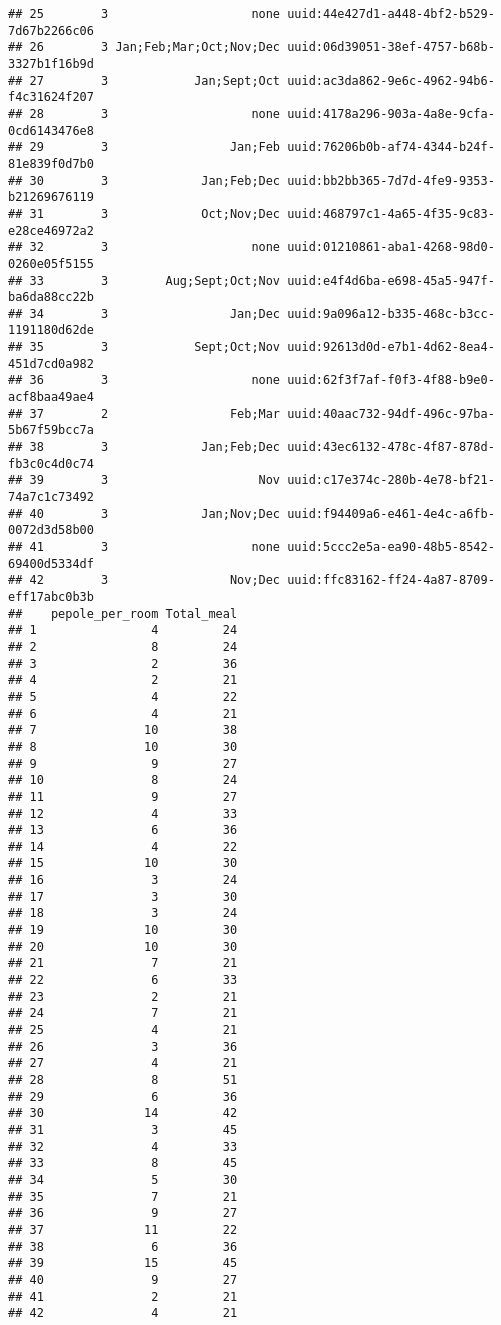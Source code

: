 \documentclass[
]{article}
\begin{document}
\begin{verbatim}
## 25        3                    none uuid:44e427d1-a448-4bf2-b529-7d67b2266c06
## 26        3 Jan;Feb;Mar;Oct;Nov;Dec uuid:06d39051-38ef-4757-b68b-3327b1f16b9d
## 27        3            Jan;Sept;Oct uuid:ac3da862-9e6c-4962-94b6-f4c31624f207
## 28        3                    none uuid:4178a296-903a-4a8e-9cfa-0cd6143476e8
## 29        3                 Jan;Feb uuid:76206b0b-af74-4344-b24f-81e839f0d7b0
## 30        3             Jan;Feb;Dec uuid:bb2bb365-7d7d-4fe9-9353-b21269676119
## 31        3             Oct;Nov;Dec uuid:468797c1-4a65-4f35-9c83-e28ce46972a2
## 32        3                    none uuid:01210861-aba1-4268-98d0-0260e05f5155
## 33        3        Aug;Sept;Oct;Nov uuid:e4f4d6ba-e698-45a5-947f-ba6da88cc22b
## 34        3                 Jan;Dec uuid:9a096a12-b335-468c-b3cc-1191180d62de
## 35        3            Sept;Oct;Nov uuid:92613d0d-e7b1-4d62-8ea4-451d7cd0a982
## 36        3                    none uuid:62f3f7af-f0f3-4f88-b9e0-acf8baa49ae4
## 37        2                 Feb;Mar uuid:40aac732-94df-496c-97ba-5b67f59bcc7a
## 38        3             Jan;Feb;Dec uuid:43ec6132-478c-4f87-878d-fb3c0c4d0c74
## 39        3                     Nov uuid:c17e374c-280b-4e78-bf21-74a7c1c73492
## 40        3             Jan;Nov;Dec uuid:f94409a6-e461-4e4c-a6fb-0072d3d58b00
## 41        3                    none uuid:5ccc2e5a-ea90-48b5-8542-69400d5334df
## 42        3                 Nov;Dec uuid:ffc83162-ff24-4a87-8709-eff17abc0b3b
##    pepole_per_room Total_meal
## 1                4         24
## 2                8         24
## 3                2         36
## 4                2         21
## 5                4         22
## 6                4         21
## 7               10         38
## 8               10         30
## 9                9         27
## 10               8         24
## 11               9         27
## 12               4         33
## 13               6         36
## 14               4         22
## 15              10         30
## 16               3         24
## 17               3         30
## 18               3         24
## 19              10         30
## 20              10         30
## 21               7         21
## 22               6         33
## 23               2         21
## 24               7         21
## 25               4         21
## 26               3         36
## 27               4         21
## 28               8         51
## 29               6         36
## 30              14         42
## 31               3         45
## 32               4         33
## 33               8         45
## 34               5         30
## 35               7         21
## 36               9         27
## 37              11         22
## 38               6         36
## 39              15         45
## 40               9         27
## 41               2         21
## 42               4         21
\end{verbatim}
\end{document}
